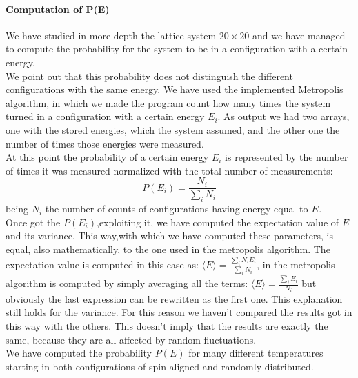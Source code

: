 \documentclass[10pt,a4paper,titlepage]{article}
\begin{document}
\paragraph{Computation of P(E)}We have studied in more depth the lattice system $20 \times 20$ and we have managed to compute the probability for the system to be in a configuration with a certain energy. 
\\We point out that this probability does not distinguish the different configurations with the same energy. We have used the implemented Metropolis algorithm, in which we made the program count how many times the system turned in a configuration with a certain energy $E_i$.  As output we had two arrays, one with the stored energies, which the system assumed, and the other one the number of times those energies were measured.
\\ At this point the probability of a certain energy $E_i$ is represented by the number of times it was measured normalized with the total number of measurements: $$P(E_i)= \frac{N_i}{\sum_{i} N_i}$$
being $N_{i}$ the number of counts of configurations having energy equal to $E_{}$.
\\Once got the $P(E_i)$,exploiting it, we have computed the expectation value of $E$ and its variance. This way,with which we have computed these parameters, is equal, also mathematically, to the one used in the metropolis algorithm. The expectation value is computed in this case as: $\langle E \rangle = \frac{\sum_{i}N_i E_i}{\sum_{i}N_i}$, in the metropolis algorithm is computed by simply averaging all the terms: $\langle E \rangle = \frac{\sum_{i}E_i}{N_i}$ but obviously the last expression can be rewritten as the first one. This explanation still holds for the variance.  For this reason we haven't compared the results got in this way with the others. This doesn't imply that the results are exactly the same, because they   are all affected by random fluctuations. 
\\
We have computed the probability $P(E)$ for many different temperatures starting in both configurations of spin aligned and randomly distributed.
\\ 
\end{document}
